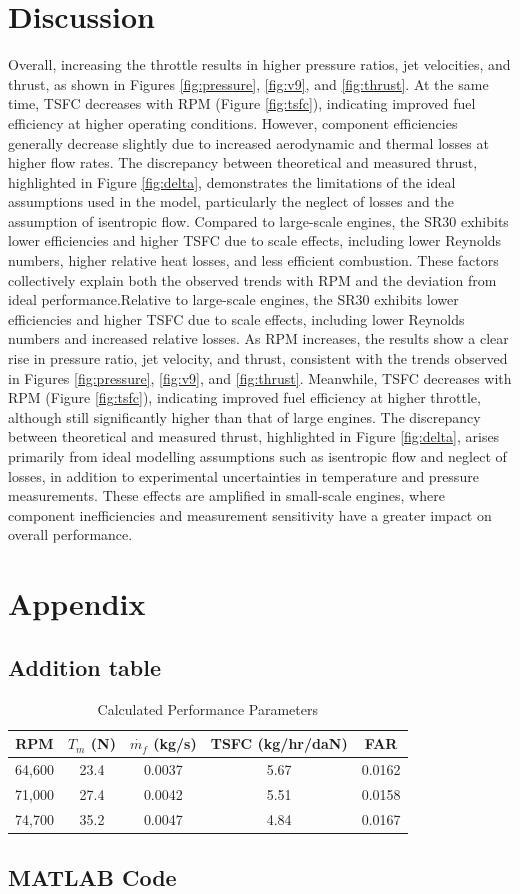 \documentclass[12pt]{article}
\begin{document}
\section{Discussion}
Overall, increasing the throttle results in higher pressure ratios, jet velocities, and thrust, as shown in Figures \ref{fig:pressure}, \ref{fig:v9}, and \ref{fig:thrust}. At the same time, TSFC decreases with RPM (Figure \ref{fig:tsfc}), indicating improved fuel efficiency at higher operating conditions. However, component efficiencies generally decrease slightly due to increased aerodynamic and thermal losses at higher flow rates. The discrepancy between theoretical and measured thrust, highlighted in Figure \ref{fig:delta}, demonstrates the limitations of the ideal assumptions used in the model, particularly the neglect of losses and the assumption of isentropic flow. Compared to large-scale engines, the SR30 exhibits lower efficiencies and higher TSFC due to scale effects, including lower Reynolds numbers, higher relative heat losses, and less efficient combustion. These factors collectively explain both the observed trends with RPM and the deviation from ideal performance.Relative to large-scale engines, the SR30 exhibits lower efficiencies and higher TSFC due to scale effects, including lower Reynolds numbers and increased relative losses. As RPM increases, the results show a clear rise in pressure ratio, jet velocity, and thrust, consistent with the trends observed in Figures \ref{fig:pressure}, \ref{fig:v9}, and \ref{fig:thrust}. Meanwhile, TSFC decreases with RPM (Figure \ref{fig:tsfc}), indicating improved fuel efficiency at higher throttle, although still significantly higher than that of large engines. The discrepancy between theoretical and measured thrust, highlighted in Figure \ref{fig:delta}, arises primarily from ideal modelling assumptions such as isentropic flow and neglect of losses, in addition to experimental uncertainties in temperature and pressure measurements. These effects are amplified in small-scale engines, where component inefficiencies and measurement sensitivity have a greater impact on overall performance.
\newpage
\appendix
\section{Appendix}
\subsection{Addition table}
\begin{table}[H]
\centering
\caption{Calculated Performance Parameters}
\begin{tabular}{ccccc}
\toprule
RPM & $T_m$ (N) & $\dot{m_f}$ (kg/s) & TSFC (kg/hr/daN) & FAR \\
\midrule
64,600 & 23.4 & 0.0037 & 5.67 & 0.0162 \\
71,000 & 27.4 & 0.0042 & 5.51 & 0.0158 \\
74,700 & 35.2 & 0.0047 & 4.84 & 0.0167 \\
\bottomrule
\end{tabular}
\end{table}
\subsection{MATLAB Code}

\end{document}
